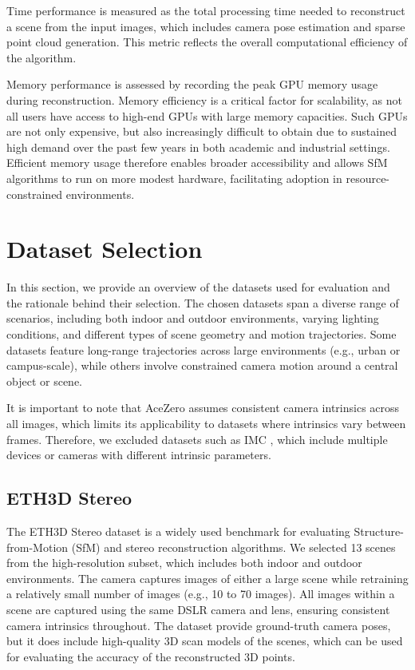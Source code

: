 Time performance is measured as the total processing time needed to reconstruct a scene from the input images, which includes camera pose estimation and sparse point cloud generation. 
This metric reflects the overall computational efficiency of the algorithm.

Memory performance is assessed by recording the peak GPU memory usage during reconstruction. Memory efficiency is a critical factor for scalability, as not all users have access to high-end GPUs with large memory capacities. 
Such GPUs are not only expensive, but also increasingly difficult to obtain due to sustained high demand over the past few years in both academic and industrial settings. 
Efficient memory usage therefore enables broader accessibility and allows SfM algorithms to run on more modest hardware, facilitating adoption in resource-constrained environments.


\section{Dataset Selection}\label{sec:dataset-selection}

In this section, we provide an overview of the datasets used for evaluation and the rationale behind their selection.
The chosen datasets span a diverse range of scenarios, including both indoor and outdoor environments, varying lighting conditions, and different types of scene geometry and motion trajectories.
Some datasets feature long-range trajectories across large environments (e.g., urban or campus-scale), while others involve constrained camera motion around a central object or scene.

It is important to note that AceZero assumes consistent camera intrinsics across all images, which limits its applicability to datasets where intrinsics vary between frames.
Therefore, we excluded datasets such as IMC \cite{Jin2020}, which include multiple devices or cameras with different intrinsic parameters.

\subsection{ETH3D Stereo}
The ETH3D Stereo dataset \cite{schoeps2017cvpr} is a widely used benchmark for evaluating Structure-from-Motion (SfM) and stereo reconstruction algorithms. 
We selected 13 scenes from the high-resolution subset, which includes both indoor and outdoor environments. 
The camera captures images of either a large scene while retraining a relatively small number of images (e.g., 10 to 70 images).
All images within a scene are captured using the same DSLR camera and lens, ensuring consistent camera intrinsics throughout. 
The dataset provide ground-truth camera poses, but it does include high-quality 3D scan models of the scenes, which can be used for evaluating the accuracy of the reconstructed 3D points.

